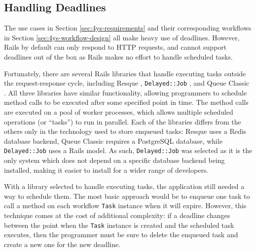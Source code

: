 \documentclass[document.tex]{subfiles}
\begin{document}
\FloatBarrier


\subsection{Handling Deadlines}
\label {sec:4ys-handling-deadlines}

The use cases in Section \ref{sec:4ys-requirements} and their corresponding
workflows in Section \ref{sec:4ys-workflow-design} all make heavy use of deadlines. However, Rails by default can only respond to HTTP requests, and cannot support deadlines out of the box as Rails makes no effort to handle scheduled tasks.

Fortunately, there are several Rails libraries that handle executing tasks outside the request-response cycle, including Resque \cite{resque}, \verb!Delayed::Job! \cite{delayed_job}, and Queue Classic \cite{queue_classic}. All three libraries have similar functionality, allowing programmers to schedule method calls to be executed after some specified point in time. The method calls are executed on a pool of worker processes, which allows multiple scheduled operations (or ``tasks'') to run in parallel. Each of the libraries differs from the others only in the technology used to store enqueued tasks: Resque uses a Redis database backend, Queue Classic requires a PostgreSQL database, while \verb!Delayed::Job! uses a Rails model. As such, \verb!Delayed::Job! was selected as it is the only system which does not depend on a specific database backend being installed, making it easier to install for a wider range of developers.

With a library selected to handle executing tasks, the application still needed  a way to schedule them. The most basic approach would be to enqueue one task to call a method on each workflow \verb!Task! instance when it will expire. However, this technique comes at the cost of additional complexity: if a deadline changes between the point when the \verb!Task! instance is created and the scheduled task executes, then the programmer must be sure to delete the enqueued task and create a new one for the new deadline.
\end{document}
